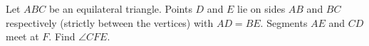 Let $ABC$ be an equilateral triangle. Points $D$ and $E$ lie on sides $AB$ and $BC$ respectively (strictly between the vertices) with $AD=BE$. Segments $AE$ and $CD$ meet at $F$. Find $\angle CFE$.

